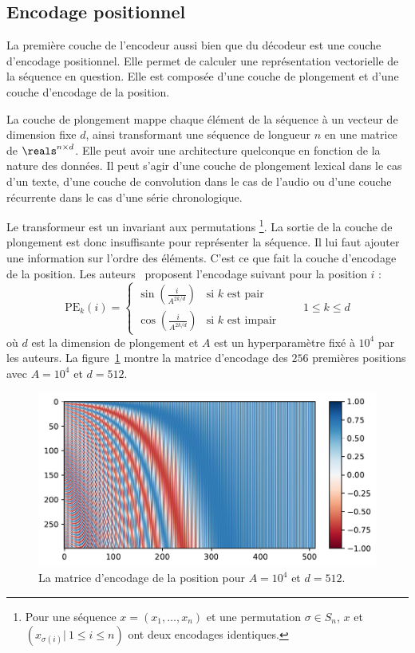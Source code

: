 \subsection{Encodage positionnel}

La première couche de l'encodeur aussi bien que du décodeur est une couche d'encodage positionnel.
Elle permet de calculer une représentation vectorielle de la séquence en question.
Elle est composée d'une couche de plongement et d'une couche d'encodage de la position.

La couche de plongement mappe chaque élément de la séquence à un vecteur de dimension fixe \(d\),
ainsi transformant une séquence de longueur \(n\) en une matrice de \(\reals^{n \times d}\).
Elle peut avoir une architecture quelconque en fonction de la nature des données.
Il peut s'agir d'une couche de plongement lexical dans le cas d'un texte, 
d'une couche de convolution dans le cas de l'audio 
ou d'une couche récurrente dans le cas d'une série chronologique.

Le transformeur est un invariant aux permutations%
\footnote{%
    Pour une séquence \(x = (x_1, \ldots, x_n)\) et une permutation \(\sigma\in S_n\),
    \(x\) et \(\left(x_{\sigma(i)}|\ 1 \le i \le n\right)\) ont deux encodages identiques.
}.
La sortie de la couche de plongement est donc insuffisante pour représenter la séquence.
Il lui faut ajouter une information sur l'ordre des éléments.
C'est ce que fait la couche d'encodage de la position.
Les auteurs~\cite{attention} proposent l'encodage suivant pour la position \(i\) :
\begin{equation}
    \label{eq.sine-positional-encoding}
    \mathrm{PE}_{k}(i) = 
    \begin{cases}
        \sin\left(\frac{i}{A^{2k/d}}\right) & \text{si } k \text{ est pair} \\
        \cos\left(\frac{i}{A^{2k/d}}\right) & \text{si } k \text{ est impair}
    \end{cases} \qquad 1 \le k \le d
\end{equation}
où \(d\) est la dimension de plongement et \(A\) est un hyperparamètre fixé à \(10^4\) par les auteurs.
La figure~\ref{fig.positional-encoding} montre la matrice d'encodage des \(256\) premières positions
avec \(A=10^4\) et \(d=512\).

\begin{figure}[htb]
    \centering
    \includegraphics[width=12cm]{assets/python/positional_embedding.pdf}
    \caption{La matrice d'encodage de la position pour \(A=10^4\) et \(d=512\).}
    \label{fig.positional-encoding}
    
\end{figure}

